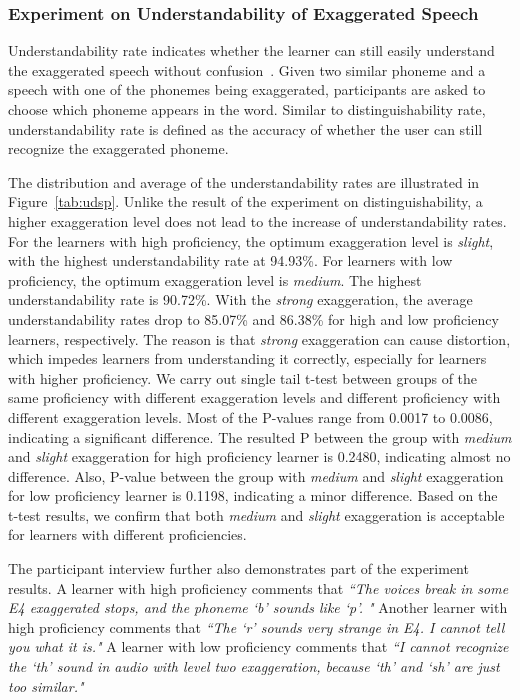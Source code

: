 \documentclass[sigconf]{acmart}
\begin{document}
\subsubsection{Experiment on Understandability of Exaggerated Speech}
\label{sec:understandability}

Understandability rate indicates whether the learner can still easily understand the exaggerated speech without confusion~\cite{veselovska2016teaching, munro1999canadians, cervino2010investigating, mora2017relationship}.
Given two similar phoneme and a speech with one of the phonemes being exaggerated, participants are asked to choose which phoneme appears in the word. %
Similar to distinguishability rate, understandability rate is defined as the accuracy of whether the user can still recognize the exaggerated phoneme. %


The distribution and average of the understandability rates are illustrated in Figure~\ref{tab:udsp}. Unlike the result of the experiment on distinguishability, a higher exaggeration level does not lead to the increase of understandability rates. %
For the learners with high proficiency, the optimum exaggeration level is \textit{slight}, with the highest understandability rate at 94.93\%. %
For learners with low proficiency, the optimum exaggeration level is \textit{medium}. The highest understandability rate is 90.72\%. %
With the \textit{strong} exaggeration, the average understandability rates drop to 85.07\% and 86.38\% for high and low proficiency learners, respectively. %
The reason is that \textit{strong} exaggeration can cause distortion, which impedes learners from understanding it correctly, especially for learners with higher proficiency. %
We carry out single tail t-test between groups of the same proficiency with different exaggeration levels and different proficiency with different exaggeration levels. %
Most of the P-values range from 0.0017 to 0.0086, indicating a significant difference. %
The resulted P between the group with \textit{medium} and \textit{slight} exaggeration for high proficiency learner is 0.2480, indicating almost no difference. %
Also, P-value between the group with \textit{medium} and \textit{slight} exaggeration for low proficiency learner is 0.1198, indicating a minor difference. %
Based on the t-test results, we confirm that both \textit{medium} and \textit{slight} exaggeration is acceptable for learners with different proficiencies. %


The participant interview further also demonstrates part of the experiment results. %
A learner with high proficiency comments that \emph{``The voices break in some E4 exaggerated stops, and the phoneme `b' sounds like `p'. "}
Another learner with high proficiency comments that \emph{``The `r' sounds very strange in E4. I cannot tell you what it is."} %
A learner with low proficiency comments that \emph{``I cannot recognize the `th' sound in audio with level two exaggeration, because `th' and `sh' are just too similar."} %
\end{document}
